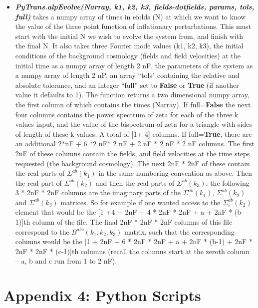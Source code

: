 \documentclass[10pt,
amsmath,amssymb,
aps,prd,nofootinbib,eqsecnum,a4paper]{revtex4}
\begin{document}
\begin{itemize}
\item  {\it \bf PyTrans.alpEvolve(Narray, k1, k2, k3, fields-dotfields, params, tols, full)} takes a numpy array of times in efolds (N) 
    at which we want to know the value of the three point function of inflationary perturbations. 
    This must start with the initial N we wish to evolve the system from, and finish with the 
    final N. It also takes three Fourier mode values 
    (k1, k2, k3), the initial conditions of the background cosmology (fields and field velocities) at the initial time as a numpy array of length 2 nF, the parameters of the system as a numpy array of length 2 nP, an array ``tols" containing the relative and absolute tolerance, 
    and an integer ``full'' set to {\color{blue}\bf{False}} or {\color{blue}\bf{True}}
    (if another value it defaults to 1). 
    The function returns a two dimensional numpy array, 
     the first column of which contains the times (Narray). 
    If full={\color{blue}\bf{False}} the next four columns contains the power spectrum of zeta 
     for each of the three k values input, and the value of the 
     bispectrum of zeta for a triangle with sides of length of these k values. A total of [1+  4] columns. If full={\color{blue}\bf{True}}, there are 
     an additional 2*nF + 6 *2  nF* 2 nF + 2 nF * 2 nF * 2 nF columns. The first 2nF  of these columns contain 
     the fields, and field velocities at the time steps requested (the background cosmology). The next 2nF * 2nF of these contain the real 
    parts of $\Sigma^{ab}(k_1)$ in the same numbering convention as above. Then the real part of 
    $\Sigma^{ab}(k_2)$ and then the real parts of $\Sigma^{ab}(k_3)$, the following 3 * 2nF * 2nF columns are 
    the imaginary parts of the $\Sigma^{ab}(k_1)$, $\Sigma^{ab}(k_2)$ and $\Sigma^{ab}(k_3)$ matrices. So for 
    example if one wanted access to the $\Sigma_i^{ab}(k_2)$ element that would be the 
    [1 +4 + 2nF + 4 * 2nF * 2nF + a + 2nF * (b-1)]th column of the file. The final 
    2nF * 2nF * 2nF columns of this file correspond to the $B^{abc}(k_1,k_2,k_3)$ matrix, such that     
    the corresponding columns would be the [1 + 2nF + 6 * 2nF * 2nF + a + 2nF * (b-1) + 
    2nF * 2nF * 2nF * (c-1)]th columns (recall the columns start at the zeroth column -- a, b and c run from 1 to 2 nF). 

\end{itemize}

\section*{Appendix 4: Python Scripts}
\end{document}

